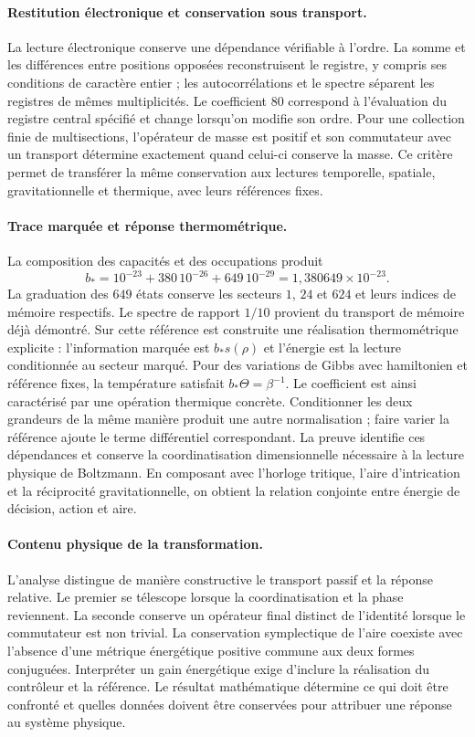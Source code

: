 \paragraph{Restitution électronique et conservation sous transport.}
La lecture électronique conserve une dépendance vérifiable à l’ordre.
La somme et les différences entre positions opposées reconstruisent le
registre, y compris ses conditions de caractère entier ; les autocorrélations
et le spectre séparent les registres de mêmes multiplicités. Le
coefficient $80$ correspond à l’évaluation du registre central
spécifié et change lorsqu’on modifie son ordre. Pour une collection finie
de multisections, l’opérateur de masse est positif et son commutateur
avec un transport détermine exactement quand celui-ci conserve la masse.
Ce critère permet de transférer la même conservation aux lectures
temporelle, spatiale, gravitationnelle et thermique, avec leurs références fixes.

\newpage
\paragraph{Trace marquée et réponse thermométrique.}
La composition des capacités et des occupations produit
\[
 b_*=10^{-23}+380\,10^{-26}+649\,10^{-29}
     =1{,}380649\times10^{-23}.
\]
La graduation des $649$ états conserve les secteurs $1$, $24$
et $624$ et leurs indices de mémoire respectifs. Le spectre de rapport
$1/10$ provient du transport de mémoire déjà démontré. Sur cette
référence est construite une réalisation thermométrique explicite :
l’information marquée est $b_*s(\rho)$ et l’énergie est la lecture
conditionnée au secteur marqué. Pour des variations de Gibbs avec
hamiltonien et référence fixes, la température satisfait
$b_*\Theta=\beta^{-1}$. Le coefficient est ainsi caractérisé par
une opération thermique concrète. Conditionner les deux grandeurs de la
même manière produit une autre normalisation ; faire varier la référence ajoute
le terme différentiel correspondant. La preuve identifie ces
dépendances et conserve la coordinatisation dimensionnelle nécessaire à la
lecture physique de Boltzmann. En composant avec l’horloge tritique,
l’aire d’intrication et la réciprocité gravitationnelle, on obtient
la relation conjointe entre énergie de décision, action et aire.

\paragraph{Contenu physique de la transformation.}
L’analyse distingue de manière constructive le transport
passif et la réponse relative. Le premier se télescope lorsque la coordinatisation
et la phase reviennent. La seconde conserve un opérateur final distinct de l’identité
lorsque le commutateur est non trivial. La conservation symplectique de l’aire
coexiste avec l’absence d’une métrique énergétique positive commune aux
deux formes conjuguées. Interpréter un gain énergétique exige
d’inclure la réalisation du contrôleur et la référence. Le résultat
mathématique détermine ce qui doit être confronté et quelles données doivent être conservées
pour attribuer une réponse au système physique.

